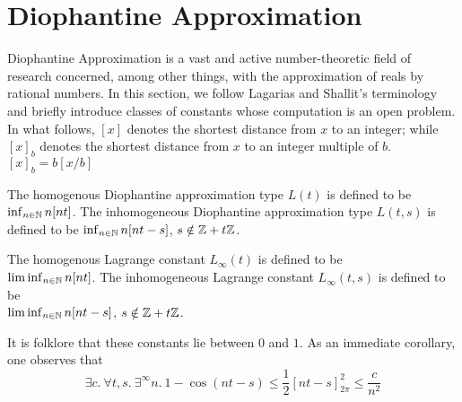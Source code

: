 \section{Diophantine Approximation}
\label{section:diophantine}

Diophantine Approximation is a vast and active number-theoretic field of research concerned, among other things, with the approximation of reals by rational numbers. In this section, we follow Lagarias and Shallit’s terminology \cite{dio-constants} and briefly introduce classes of constants whose computation is an open problem. In what follows, $[x]$ denotes the shortest distance from $x$ to an integer; while $[x]_b$ denotes the shortest distance from $x$ to an integer multiple of $b$. $[x]_b = b[x/b]$

\begin{definition}
\label{def:L}
The homogenous Diophantine approximation type $L(t)$ is defined to be $\inf_{n \in \mathbb{N}} n[nt]$. The inhomogeneous Diophantine approximation type $L(t, s)$ is defined to be $\inf_{n \in \mathbb{N}} n[nt - s]$, $s \notin \mathbb{Z} + t\mathbb{Z}$. 
\end{definition} 

\begin{definition}
\label{def:Linfty}
The homogenous Lagrange constant $L_\infty(t)$ is defined to be \\ $\liminf_{n \in \mathbb{N}} n[nt]$. The inhomogeneous Lagrange constant $L_\infty(t, s)$ is defined to be\\ $\liminf_{n \in \mathbb{N}} n[nt - s]$, $s \notin \mathbb{Z} + t\mathbb{Z}$.
\end{definition} 

It is folklore that these constants lie between $0$ and $1$. As an immediate corollary, one observes that
\begin{equation}
\label{eq:quadraticdecay}
\exists c.~\forall t, s.~ \exists^\infty n. ~ 1 - \cos(nt - s) \le \frac{1}{2}\left[nt-s\right]_{2\pi}^2 \le \frac{c}{n^2}
\end{equation}

